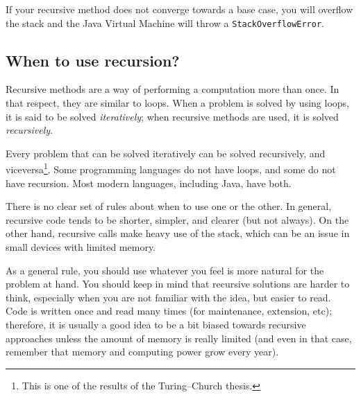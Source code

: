If your recursive method does not converge towards a base case, you
will overflow the stack and the Java Virtual Machine will throw a
\verb+StackOverflowError+. 

\subsection{When to use recursion?}
\label{sec:when-use-recursion}

Recursive methods are a way of performing a computation more than
once. In that respect, they are similar to loops. When a problem is
solved by using loops, it is said to be solved \emph{iteratively};
when recursive methods are used, it is solved \emph{recursively}. 

Every problem that can be solved iteratively can be solved
recursively, and viceversa\footnote{This is one of the results of the
 Turing--Church thesis.}. Some programming languages do not have
loops, and some do not have recursion. Most modern languages,
including Java, have both. 

There is no clear set of rules about when to use one or the other. In
general, recursive code tends to be shorter, simpler, and clearer (but
not always). On the other hand, recursive calls make heavy use of the
stack, which can be an issue in small devices with limited memory. 

As a general rule, you should use whatever you feel is more natural
for the problem at hand. You should keep in mind that recursive
solutions are harder to think, especially when you are not familiar
with the idea, but easier to read. Code is written once and read many
times (for maintenance, extension, etc); therefore, it is usually a good
idea to be a bit biased towards recursive approaches unless the amount
of memory is really limited (and even in that case, remember that
memory and computing power grow every year). 






